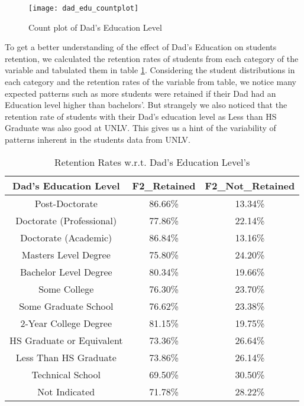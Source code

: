 \documentclass[11pt,openright]{report}
\begin{document}
\begin{figure}[!ht]
	\centering
	\texttt{[image: dad\_edu\_countplot]}
	\caption{Count plot of Dad's Education Level }
	\label{fig:dad_edu_F2NotRetained_plot}
\end{figure}

To get a better understanding of the effect of Dad's Education on students retention, we calculated the retention rates of students from each category of the variable and tabulated them in table  \ref{table:dad_edu_retentions}. Considering the student distributions in each category and the retention rates of the variable from table, we notice many expected patterns such as more students were retained if their Dad had an Education level higher than bachelors'. But strangely we also noticed that the retention rate of students with their Dad's education level as Less than HS Graduate was also good at UNLV. This gives us a hint of the variability of patterns inherent in the students data from UNLV.

\begin{table}[!t]
	\renewcommand{\arraystretch}{1.3}
	\caption{Retention Rates w.r.t. Dad's Education Level's}
	\label{table:dad_edu_retentions}
	\centering
	\begin{tabular}{|c|c|c|}
		\hline
		\bfseries Dad's Education Level & \bfseries F2\_Retained & \bfseries F2\_Not\_Retained\\
		\hline
		Post-Doctorate  & 86.66\%  & 13.34\% \\ \hline
		Doctorate (Professional) & 77.86\% &  22.14\% \\ \hline
		Doctorate (Academic) & 86.84\% & 13.16\% \\ \hline
		Masters Level Degree    &   75.80\% &  24.20\% \\ \hline
		Bachelor Level Degree &  80.34\%  & 19.66\% \\ \hline
		Some College & 76.30\% & 23.70\% \\ \hline
		Some Graduate School  & 76.62\% &  23.38\% \\ \hline
		2-Year College Degree    &  81.15\%  & 19.75\% \\ \hline
		HS Graduate or Equivalent  & 73.36\% &  26.64\% \\ \hline
		Less Than HS Graduate     & 73.86\% &  26.14\% \\ \hline
		Technical School  &         69.50\% &  30.50\% \\ \hline
		Not Indicated         &    71.78\% & 28.22\% \\ \hline
	\end{tabular}
\end{table}
\end{document}
